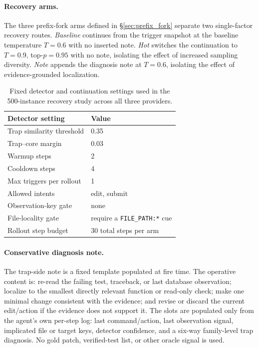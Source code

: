 \paragraph{Recovery arms.}
The three prefix-fork arms defined in \S\ref{sec:prefix_fork} separate two single-factor recovery routes.
\emph{Baseline} continues from the trigger snapshot at the baseline temperature $T{=}0.6$ with no inserted note.
\emph{Hot} switches the continuation to $T{=}0.9$, top-$p{=}0.95$ with no note, isolating the effect of increased sampling diversity.
\emph{Note} appends the diagnosis note at $T{=}0.6$, isolating the effect of evidence-grounded localization.

\begin{table}[h]
\centering
\small
\setlength{\tabcolsep}{5pt}
\begin{tabular}{ll}
\toprule
\textbf{Detector setting} & \textbf{Value} \\
\midrule
Trap similarity threshold & 0.35 \\
Trap--core margin & 0.03 \\
Warmup steps & 2 \\
Cooldown steps & 4 \\
Max triggers per rollout & 1 \\
Allowed intents & edit, submit \\
Observation-key gate & none \\
File-locality gate & require a \texttt{FILE\_PATH:*} cue \\
Rollout step budget & 30 total steps per arm \\
\bottomrule
\end{tabular}
\caption{Fixed detector and continuation settings used in the 500-instance \swe{} recovery study across all three providers.}
\label{tab:detector_hparams}
\end{table}

\paragraph{Conservative diagnosis note.}
The trap-side note is a fixed template populated at fire time.
The operative content is: re-read the failing test, traceback, or last database observation; localize to the smallest directly relevant function or read-only check; make one minimal change consistent with the evidence; and revise or discard the current edit/action if the evidence does not support it.
The slots are populated only from the agent's own per-step log: last command/action, last observation signal, implicated file or target keys, detector confidence, and a six-way family-level trap diagnosis.
No gold patch, verified-test list, or other oracle signal is used.

